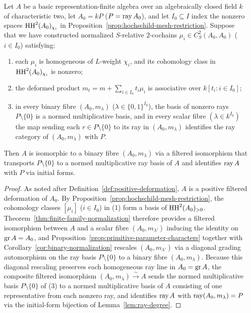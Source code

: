 \begin{proposition}
\label{prop:family-criterion}
Let $A$ be a basic representation-finite algebra over an algebraically closed
field $k$ of characteristic two, let $A_0=kP$ ($P=\operatorname{ray} A_0$), and let
$I_0\subseteq I$ index the nonzero spaces $\operatorname{HH}^2(A_0)_{\chi_i}$ in
Proposition~\ref{prop:hochschild-mesh-restriction}. Suppose that we have
constructed normalized $S$-relative $2$-cochains
$\mu_i\in C^2_S(A_0,A_0)$ ($i\in I_0$) satisfying:
\begin{enumerate}[label={\upshape(\arabic*)}]
\item each $\mu_i$ is homogeneous of $L$-weight $\chi_i$, and its cohomology
class in $\operatorname{HH}^2(A_0)_{\chi_i}$ is nonzero;
\item the deformed product $m_t=m+\sum_{i\in I_0}t_i\mu_i$ is associative
over $k[t_i:i\in I_0]$;
\item in every binary fibre $(A_0,m_\lambda)$ ($\lambda\in\{0,1\}^{I_0}$),
the basis of nonzero rays $P\setminus\{0\}$ is a normed multiplicative basis,
and in every scalar fibre $(\lambda\in k^{I_0})$ the map sending each
$r\in P\setminus\{0\}$ to its ray in $(A_0,m_\lambda)$ identifies the ray
category of $(A_0,m_\lambda)$ with $P$.
\end{enumerate}
Then $A$ is isomorphic to a binary fibre $(A_0,m_\lambda)$ via a filtered
isomorphism that transports $P\setminus\{0\}$ to a normed multiplicative ray
basis of $A$ and identifies $\operatorname{ray} A$ with $P$ via initial forms.
\end{proposition}
\begin{proof}
As noted after Definition~\ref{def:positive-deformation}, $A$ is a positive
filtered deformation of $A_0$. By Proposition~\ref{prop:hochschild-mesh-restriction},
the cohomology classes $[\mu_i]$ ($i\in I_0$) in (1) form a basis of
$\operatorname{HH}^2(A_0)_{>0}$. Theorem~\ref{thm:finite-family-normalization} therefore
provides a filtered isomorphism between $A$ and a scalar fibre
$(A_0,m_{\lambda'})$ inducing the identity on $\operatorname{gr} A=A_0$, and
Proposition~\ref{prop:primitive-parameter-characters} together with
Corollary~\ref{cor:binary-normalization} rescales $(A_0,m_{\lambda'})$ via a
diagonal grading automorphism on the ray basis $P\setminus\{0\}$ to a binary
fibre $(A_0,m_\lambda)$. Because this diagonal rescaling preserves each
homogeneous ray line in $A_0=\operatorname{gr} A$, the composite filtered isomorphism
$(A_0,m_\lambda)\xrightarrow{\sim}A$ sends the normed multiplicative basis
$P\setminus\{0\}$ of (3) to a normed multiplicative basis of $A$ consisting
of one representative from each nonzero ray, and identifies $\operatorname{ray} A$ with
$\operatorname{ray}(A_0,m_\lambda)=P$ via the initial-form bijection of
Lemma~\ref{lem:ray-degree}.
\end{proof}
